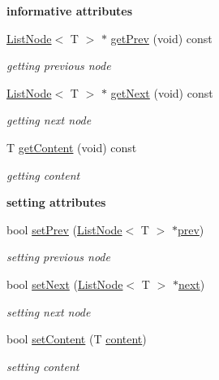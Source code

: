 \begin{Indent}{\bf informative attributes}\par
\begin{DoxyCompactItemize}
\item 
\hyperlink{class_list_node}{List\-Node}$<$ T $>$ $\ast$ \hyperlink{class_list_node_a531d10b4e22c59c7e802a9b09b560d9d}{get\-Prev} (void) const 
\begin{DoxyCompactList}\small\item\em getting previous node \end{DoxyCompactList}\item 
\hyperlink{class_list_node}{List\-Node}$<$ T $>$ $\ast$ \hyperlink{class_list_node_a5c75fbb5b607f52d50686d42a3f40bef}{get\-Next} (void) const 
\begin{DoxyCompactList}\small\item\em getting next node \end{DoxyCompactList}\item 
T \hyperlink{class_list_node_a53d6da0c514950a40956955bc1e383ab}{get\-Content} (void) const 
\begin{DoxyCompactList}\small\item\em getting content \end{DoxyCompactList}\end{DoxyCompactItemize}
\end{Indent}
\begin{Indent}{\bf setting attributes}\par
\begin{DoxyCompactItemize}
\item 
bool \hyperlink{class_list_node_a66ddf2d4a22600f256d93a3f60740c13}{set\-Prev} (\hyperlink{class_list_node}{List\-Node}$<$ T $>$ $\ast$\hyperlink{class_list_node_a997ca532d810ebd030726ff880ba76b5}{prev})
\begin{DoxyCompactList}\small\item\em setting previous node \end{DoxyCompactList}\item 
bool \hyperlink{class_list_node_a98d9eb542018713a5fc8d284aa62b3a5}{set\-Next} (\hyperlink{class_list_node}{List\-Node}$<$ T $>$ $\ast$\hyperlink{class_list_node_a97909c9598053ffd24b77ec715f745f1}{next})
\begin{DoxyCompactList}\small\item\em setting next node \end{DoxyCompactList}\item 
bool \hyperlink{class_list_node_af6f3ae03b93789922f0482f285a05a3a}{set\-Content} (T \hyperlink{class_list_node_a75aabe0bfbeace74391ab20546454e05}{content})
\begin{DoxyCompactList}\small\item\em setting content \end{DoxyCompactList}\end{DoxyCompactItemize}
\end{Indent}
